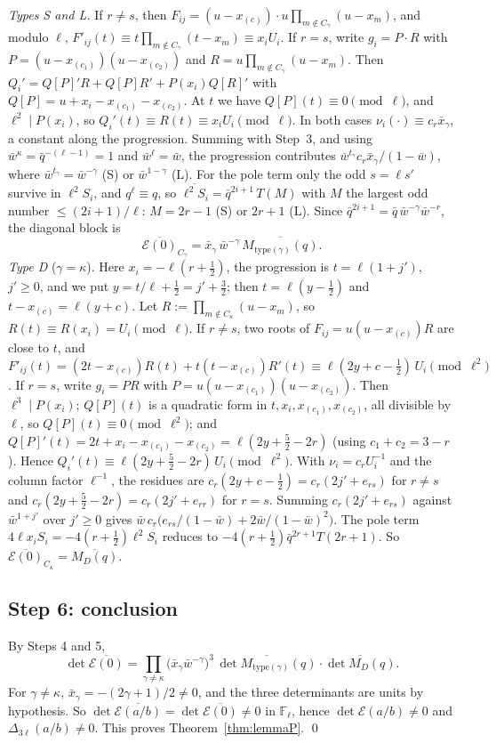 \documentclass[11pt]{amsart}
\theoremstyle{definition}
\theoremstyle{remark}
\numberwithin{equation}{section}
\newcommand{\FF}{\mathbb{F}}
\begin{document}
\emph{Types S and L.} If $r\ne s$, then
$F_{ij}=(u-x_{(c)})\cdot u\prod_{m\notin C_\gamma}(u-x_m)$, and modulo $\ell$, $F'_{ij}(t)\equiv t\prod_{m\notin C_\gamma}(t-x_m)\equiv x_iU_i$.
If $r=s$, write $g_i=P\cdot R$ with $P=(u-x_{(c_1)})(u-x_{(c_2)})$ and $R=u\prod_{m\notin C_\gamma}(u-x_m)$. Then
$Q_i'=Q[P]'R+Q[P]R'+P(x_i)Q[R]'$ with $Q[P]=u+x_i-x_{(c_1)}-x_{(c_2)}$. At $t$ we have $Q[P](t)\equiv0\pmod\ell$, and
$\ell^2\mid P(x_i)$, so $Q_i'(t)\equiv R(t)\equiv x_iU_i\pmod\ell$. In both cases $\nu_i(\cdot)\equiv c_r\bar x_\gamma$, a constant along
the progression. Summing with Step~3, and using $\bar w^\kappa=\bar q^{-(\ell-1)}=1$ and $\bar w^\ell=\bar w$, the progression
contributes $\bar w^{t_\gamma}c_r\bar x_\gamma/(1-\bar w)$, where $\bar w^{t_\gamma}=\bar w^{-\gamma}$ (S) or $\bar w^{1-\gamma}$ (L). For
the pole term only the odd $s=\ell s'$ survive in $\ell^2S_i$, and $q^\ell\equiv q$, so
$\overline{\ell^2S_i}=\bar q^{2i+1}\,T(M)$ with $M$ the largest odd number $\le(2i+1)/\ell$: $M=2r-1$ (S) or $2r+1$ (L). Since
$\bar q^{2i+1}=\bar q\,\bar w^{-\gamma}\bar w^{-r}$, the diagonal block is
\[
  \overline{\mathcal E(0)}_{C_\gamma}=\bar x_\gamma\,\bar w^{-\gamma}\,\overline{M_{\mathrm{type}(\gamma)}(q)} .
\]
\emph{Type D} ($\gamma=\kappa$). Here $x_i=-\ell(r+\frac12)$, the progression is $t=\ell(1+j')$, $j'\ge0$, and we put
$y=t/\ell+\frac12=j'+\frac32$; then $t=\ell(y-\frac12)$ and $t-x_{(c)}=\ell(y+c)$. Let
$R:=\prod_{m\notin C_\kappa}(u-x_m)$, so $R(t)\equiv R(x_i)=U_i\pmod\ell$. If $r\ne s$, two roots of $F_{ij}=u(u-x_{(c)})R$ are close
to $t$, and $F'_{ij}(t)=(2t-x_{(c)})R(t)+t(t-x_{(c)})R'(t)\equiv\ell(2y+c-\frac12)\,U_i\pmod{\ell^2}$. If $r=s$, write
$g_i=PR$ with $P=u(u-x_{(c_1)})(u-x_{(c_2)})$. Then $\ell^3\mid P(x_i)$; $Q[P](t)$ is a quadratic form in
$t,x_i,x_{(c_1)},x_{(c_2)}$, all divisible by $\ell$, so $Q[P](t)\equiv0\pmod{\ell^2}$; and $Q[P]'(t)=2t+x_i-x_{(c_1)}-x_{(c_2)}=\ell(2y+\frac52-2r)$ (using $c_1+c_2=3-r$).
Hence $Q_i'(t)\equiv\ell(2y+\frac52-2r)\,U_i\pmod{\ell^2}$. With $\nu_i=c_rU_i^{-1}$ and the column factor $\ell^{-1}$, the
residues are $c_r(2y+c-\frac12)=c_r(2j'+e_{rs})$ for $r\ne s$ and $c_r(2y+\frac52-2r)=c_r(2j'+e_{rr})$ for $r=s$. Summing
$c_r(2j'+e_{rs})$ against $\bar w^{1+j'}$ over $j'\ge0$ gives $\bar w\,c_r\bigl(e_{rs}/(1-\bar w)+2\bar w/(1-\bar w)^2\bigr)$.
The pole term $4\ell x_iS_i=-4(r+\frac12)\ell^2S_i$ reduces to
$-4(r+\frac12)\bar q^{2r+1}T(2r+1)$. So $\overline{\mathcal E(0)}_{C_\kappa}=\overline{M_D(q)}$.

\subsection{Step 6: conclusion}
By Steps 4 and 5,
\[
  \det\overline{\mathcal E(0)}=\prod_{\gamma\ne\kappa}\bigl(\bar x_\gamma\bar w^{-\gamma}\bigr)^3\,\overline{\det M_{\mathrm{type}(\gamma)}(q)}\cdot\overline{\det M_D(q)} .
\]
For $\gamma\ne\kappa$, $\bar x_\gamma=-(2\gamma+1)/2\ne0$, and the three determinants are units by hypothesis. So
$\det\overline{\mathcal E(a/b)}=\det\overline{\mathcal E(0)}\ne0$ in $\FF_\ell$, hence $\det\mathcal E(a/b)\ne0$ and
$\Delta_{3\ell}(a/b)\ne0$. This proves Theorem~\ref{thm:lemmaP}. \qed
\end{document}

